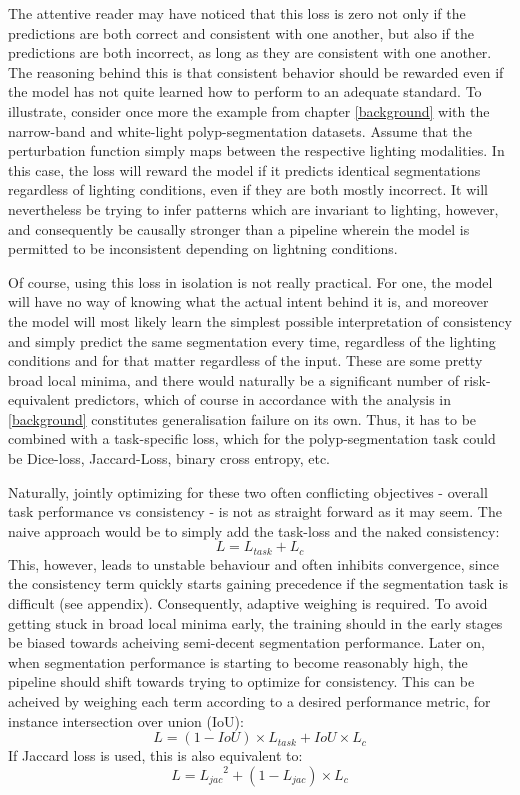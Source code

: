 	The attentive reader may have noticed that this loss is zero not only if the predictions are both correct and consistent with one another, but also if the predictions are both incorrect, as long as they are consistent with one another. The reasoning behind this is that consistent behavior should be rewarded even if the model has not quite learned how to perform to an adequate standard. To illustrate, consider once more the example from chapter \ref{background} with the narrow-band and white-light polyp-segmentation datasets. Assume that the perturbation function simply maps between the respective lighting modalities. In this case, the loss will reward the model if it predicts identical segmentations regardless of lighting conditions, even if they are both mostly incorrect. It will nevertheless be trying to infer patterns which are invariant to lighting, however, and consequently be causally stronger than a pipeline wherein the model is permitted to be inconsistent depending on lightning conditions. 
	
	Of course, using this loss in isolation is not really practical. For one, the model will have no way of knowing what the actual intent behind it is, and moreover the model will most likely learn the simplest possible interpretation of consistency and simply predict the same segmentation every time, regardless of the lighting conditions and for that matter regardless of the input. These are some pretty broad local minima, and there would naturally be a significant number of risk-equivalent predictors, which of course in accordance with the analysis in \ref{background} constitutes generalisation failure on its own. Thus, it has to be combined with a task-specific loss, which for the polyp-segmentation task could be Dice-loss, Jaccard-Loss, binary cross entropy, etc. 
	
	Naturally, jointly optimizing for these two often conflicting objectives - overall task performance vs consistency - is not as straight forward as it may seem. The naive approach would be to simply add the task-loss and the naked consistency:
	\begin{equation}
		L = L_{task} + L_c
	\end{equation}
	This, however, leads to unstable behaviour and often inhibits convergence, since the consistency term quickly starts gaining precedence if the segmentation task is difficult (see appendix). Consequently, adaptive weighing is required. To avoid getting stuck in broad local minima early, the training should in the early stages be biased towards acheiving semi-decent segmentation performance. Later on, when segmentation performance is starting to become reasonably high, the pipeline should shift towards trying to optimize for consistency. This can be acheived by weighing each term according to a desired performance metric, for instance intersection over union (IoU):
	\begin{equation}
		L = (1-IoU)\times L_{task} + IoU \times L_c
	\end{equation}
	If Jaccard loss is used, this is also equivalent to:
	\begin{equation}
		L = {L_{jac}}^2 + (1-L_{jac})\times L_c
	\end{equation}
	
